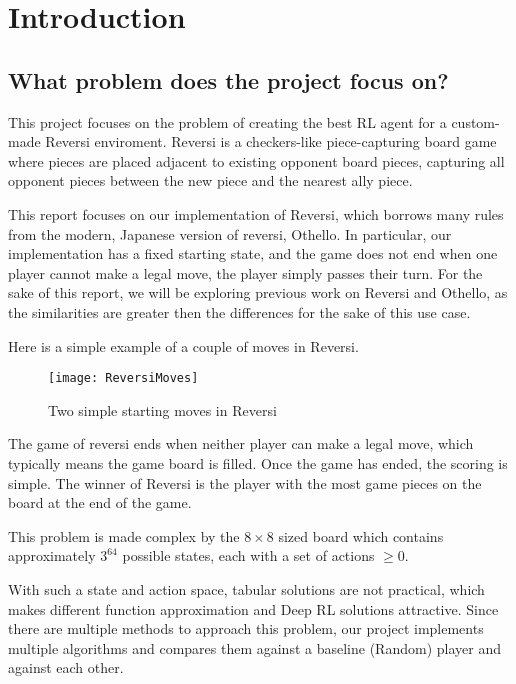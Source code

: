 \documentclass[../report.tex]{subfiles}
\begin{document}
\section{Introduction}
\label{introduction}

\subsection{What problem does the project focus on?}
\label{What problem does the project focus on?}


This project focuses on the problem of creating the best RL agent for a custom-made Reversi enviroment.
Reversi is a checkers-like piece-capturing board game where pieces are placed adjacent to existing opponent board pieces, capturing all opponent pieces between the new piece and the nearest ally piece.


This report focuses on our implementation of Reversi, which borrows many rules from the modern, Japanese version of reversi, Othello.
In particular, our implementation has a fixed starting state, and the game does not end when one player cannot make a legal move, the player simply passes their turn.
For the sake of this report, we will be exploring previous work on Reversi and Othello, as the similarities are greater then the differences for the sake of this use case.


Here is a simple example of a couple of moves in Reversi.
\begin{figure}[h]
    \centering
    \texttt{[image: ReversiMoves]}
    \caption{Two simple starting moves in Reversi}
\end{figure}
The game of reversi ends when neither player can make a legal move, which typically means the game board is filled.
Once the game has ended, the scoring is simple. The winner of Reversi is the player with the most game pieces on the board at the end of the game.


This problem is made complex by the $8\times8$ sized board which contains approximately $3^{64}$ possible states,
each with a set of actions $\geq0$.


With such a state and action space, tabular solutions are not practical, which makes different function approximation and Deep RL solutions attractive.
Since there are multiple methods to approach this problem, our project implements multiple algorithms and compares them against a baseline (Random) player and against each other.
\end{document}
